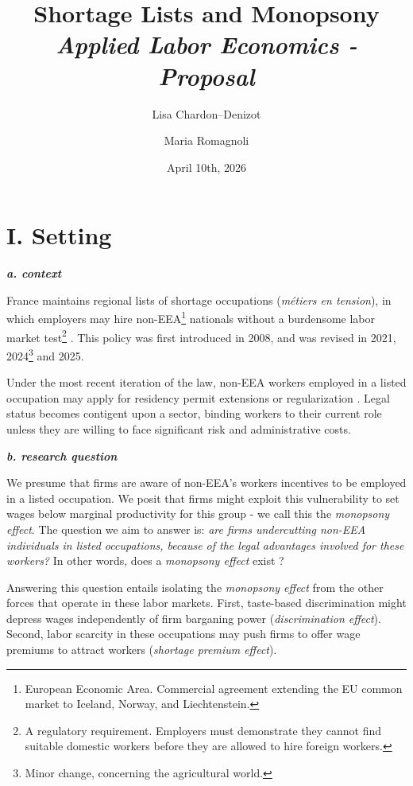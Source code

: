 \documentclass[10pt, a4paper]{article}
\title{\textbf{Shortage Lists and Monopsony}\\[0.2em]
\large \textit{Applied Labor Economics - Proposal}}
\author{Lisa Chardon--Denizot \and Maria Romagnoli}
\date{April 10th, 2026}
\begin{document}
\maketitle
\vspace{-0.5em}

\section{I. Setting}
\vspace{0.2cm}

\textit{\textbf{a. context}}

France maintains regional lists of shortage occupations (\textit{m\'etiers en tension}), in which employers may hire non-EEA\footnote{European Economic Area. Commercial agreement extending the EU common market to Iceland, Norway, and Liechtenstein.} nationals without a burdensome labor market test\footnote{A regulatory requirement. Employers must demonstrate they cannot find suitable domestic workers before they are allowed to hire foreign workers.} \citep{France2025}. This policy was first introduced in 2008, and was revised in 2021, 2024\footnote{Minor change, concerning the agricultural world.} and 2025.

Under the most recent iteration of the law, non-EEA workers employed in a listed occupation may apply for residency permit extensions or regularization \citep{France2024,ServicePublic2025}. Legal status becomes contigent upon a sector, binding workers to their current role unless they are willing to face significant risk and administrative costs.

\textbf{\textit{b. research question}}

We presume that firms are aware of non-EEA's workers incentives to be employed in a listed occupation. We posit that firms might exploit this vulnerability to set wages below marginal productivity for this group - we call this the \textit{monopsony effect}. The question we aim to answer is: \textit{are firms undercutting non-EEA individuals in listed occupations, because of the legal advantages involved for these workers?} In other words, does a \textit{monopsony effect} exist ?

Answering this question entails isolating the \textit{monopsony effect} from the other forces that operate in these labor markets. First, taste-based discrimination might depress wages independently of firm barganing power (\textit{discrimination effect}). Second, labor scarcity in these occupations may push firms to offer wage premiums to attract workers (\textit{shortage premium effect}). 
\end{document}

